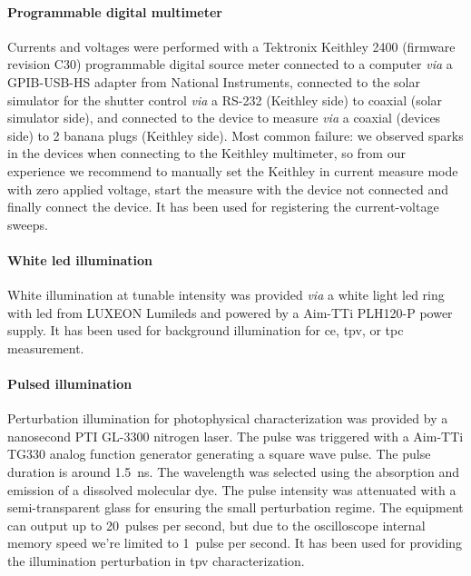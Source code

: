 		\paragraph{Programmable digital multimeter}
		Currents and voltages were performed with a Tektronix Keithley 2400 (firmware revision C30) programmable digital source meter connected to a computer \textit{via} a GPIB-USB-HS adapter from National Instruments, connected to the solar simulator for the shutter control \textit{via} a RS-232 (Keithley side) to coaxial (solar simulator side), and connected to the device to measure \textit{via} a coaxial (devices side) to 2 banana plugs (Keithley side).
		Most common failure: we observed sparks in the devices when connecting to the Keithley multimeter, so from our experience we recommend to manually set the Keithley in current measure mode with zero applied voltage, start the measure with the device not connected and finally connect the device.
		It has been used for registering the current-voltage sweeps.

		\paragraph{White \gls{led} illumination}
		White illumination at tunable intensity was provided \textit{via} a white light \gls{led} ring with \gls{led} from LUXEON Lumileds and powered by a Aim-TTi PLH120-P power supply.
		It has been used for background illumination for \acrfull{ce}, \acrfull{tpv}, or \acrfull{tpc} measurement.

		\paragraph{Pulsed illumination}
		Perturbation illumination for photophysical characterization was provided by a nanosecond PTI GL-3300 nitrogen laser.
		The pulse was triggered with a Aim-TTi TG330 analog function generator generating a square wave pulse.
		The pulse duration is around \SI{1.5}{\ns}.
		The wavelength was selected using the absorption and emission of a dissolved molecular dye.
		The pulse intensity was attenuated with a semi-transparent glass for ensuring the small perturbation regime.
		The equipment can output up to 20~pulses per second, but due to the oscilloscope internal memory speed we're limited to 1~pulse per second.
		It has been used for providing the illumination perturbation in \acrshort{tpv} characterization.

